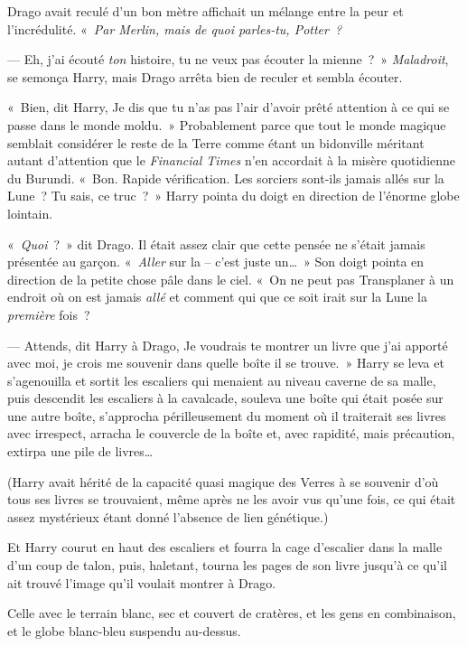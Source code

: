 Drago avait reculé d'un bon mètre affichait un mélange entre la peur et l'incrédulité.  «~\emph{Par Merlin, mais de quoi parles-tu, Potter~?}


--- Eh, j'ai écouté \emph{ton} histoire, tu ne veux pas écouter la mienne~?~» \emph{Maladroit}, se semonça Harry, mais Drago arrêta bien de reculer et sembla écouter.

«~Bien, dit Harry, Je dis que tu n'as pas l'air d'avoir prêté attention à ce qui se passe dans le monde moldu.~» Probablement parce que tout le monde magique semblait considérer le reste de la Terre comme étant un bidonville méritant autant d'attention que le \emph{Financial Times} n'en accordait à la misère quotidienne du Burundi. «~Bon. Rapide vérification. Les sorciers sont-ils jamais allés sur la Lune~? Tu sais, ce truc~?~» Harry pointa du doigt en direction de l'énorme globe lointain.

«~\emph{Quoi}~?~» dit Drago. Il était assez clair que cette pensée ne s'était jamais présentée au garçon. «~\emph{Aller} sur la -- c'est juste un…~» Son doigt pointa en direction de la petite chose pâle dans le ciel. «~On ne peut pas Transplaner à un endroit où on est jamais \emph{allé} et comment qui que ce soit irait sur la Lune la \emph{première} fois~?

--- Attends, dit Harry à Drago, Je voudrais te montrer un livre que j'ai apporté avec moi, je crois me souvenir dans quelle boîte il se trouve.~» Harry se leva et s'agenouilla et sortit les escaliers qui menaient au niveau caverne de sa malle, puis descendit les escaliers à la cavalcade, souleva une boîte qui était posée sur une autre boîte, s'approcha périlleusement du moment où il traiterait ses livres avec irrespect, arracha le couvercle de la boîte et, avec rapidité, mais précaution, extirpa une pile de livres…

(Harry avait hérité de la capacité quasi magique des Verres à se souvenir d'où tous ses livres se trouvaient, même après ne les avoir vus qu'une fois, ce qui était assez mystérieux étant donné l'absence de lien génétique.)

Et Harry courut en haut des escaliers et fourra la cage d'escalier dans la malle d'un coup de talon, puis, haletant, tourna les pages de son livre jusqu'à ce qu'il ait trouvé l'image qu'il voulait montrer à Drago.

Celle avec le terrain blanc, sec et couvert de cratères, et les gens en combinaison, et le globe blanc-bleu suspendu au-dessus.

